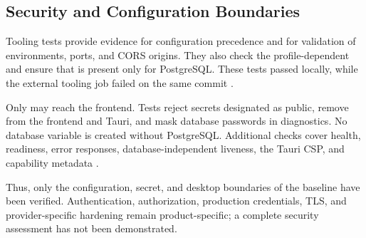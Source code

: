 \subsection{Security and Configuration Boundaries}
\label{subsec:security-konfigurationsgrenzen}

Tooling tests provide evidence for configuration precedence and for validation
of environments, ports, and CORS origins. They also check the profile-dependent
 and ensure that  is present only for
PostgreSQL. These tests passed locally, while the external tooling job failed
on the same commit
\parencite{kleiveist2026configuration,kleiveist2026ci-core-run}.

Only  may reach the frontend. Tests reject secrets
designated as public, remove  from the frontend and Tauri,
and mask database passwords in diagnostics. No database variable is created
without PostgreSQL. Additional checks cover health, readiness, error responses,
database-independent liveness, the Tauri CSP, and capability metadata
\parencite{kleiveist2026acceptance,kleiveist2026release}.

Thus, only the configuration, secret, and desktop boundaries of the baseline
have been verified. Authentication, authorization, production credentials,
TLS, and provider-specific hardening remain product-specific; a complete
security assessment has not been demonstrated.
